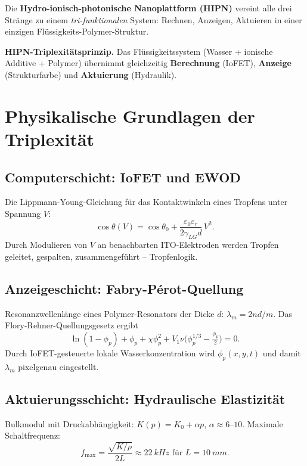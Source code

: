 ﻿\documentclass[a4paper,12pt]{scrreprt}
\theoremstyle{definition}
\begin{document}
Die \textbf{Hydro-ionisch-photonische Nanoplattform (HIPN)} vereint
alle drei Stränge zu einem \emph{tri-funktionalen} System: Rechnen,
Anzeigen, Aktuieren in einer einzigen Flüssigkeits-Polymer-Struktur.

\begin{infobox}
\textbf{HIPN-Triplexitätsprinzip.} Das Flüssigkeitssystem (Wasser +
ionische Additive + Polymer) übernimmt gleichzeitig
\textbf{Berechnung} (IoFET), \textbf{Anzeige} (Strukturfarbe) und
\textbf{Aktuierung} (Hydraulik).
\end{infobox}

\section{Physikalische Grundlagen der Triplexität}

\subsection{Computerschicht: IoFET und EWOD}

Die Lippmann-Young-Gleichung für das Kontaktwinkeln eines Tropfens
unter Spannung $V$:
\[
  \cos\theta(V) = \cos\theta_0 + \frac{\varepsilon_0\varepsilon_r}{2\gamma_{LG}d}\,V^2.
\]
Durch Modulieren von $V$ an benachbarten ITO-Elektroden werden Tropfen
geleitet, gespalten, zusammengeführt -- Tropfenlogik.

\subsection{Anzeigeschicht: Fabry-Pérot-Quellung}

Resonanzwellenlänge eines Polymer-Resonators der Dicke $d$:
$\lambda_m = 2nd/m$. Das Flory-Rehner-Quellungsgesetz ergibt
\[
  \ln(1-\phi_p)+\phi_p+\chi\phi_p^2
  + V_1\nu\bigl(\phi_p^{1/3}-\tfrac{\phi_p}{2}\bigr)=0.
\]
Durch IoFET-gesteuerte lokale Wasserkonzentration wird $\phi_p(x,y,t)$
und damit $\lambda_m$ pixelgenau eingestellt.

\subsection{Aktuierungsschicht: Hydraulische Elastizität}

Bulkmodul mit Druckabhängigkeit: $K(p) = K_0 + \alpha p$,
$\alpha \approx 6$--$10$. Maximale Schaltfrequenz:
\[
  f_{\max} = \frac{\sqrt{K/\rho}}{2L} \approx \SI{22}{kHz}
  \text{ für } L=\SI{10}{mm}.
\]
\end{document}

